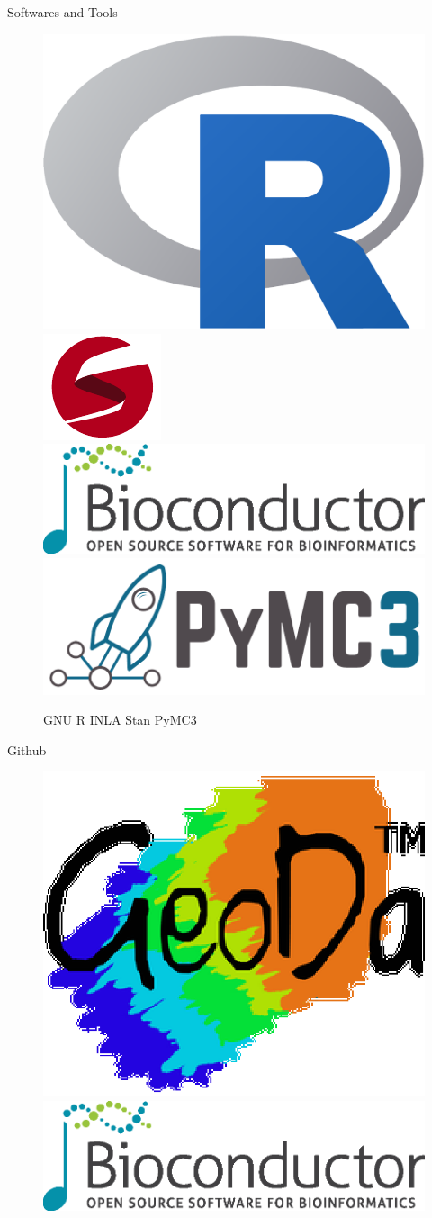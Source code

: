 \documentclass[11pt,compress,xcolor=x11names,UTF8]{beamer}
\begin{document}
\begin{frame}{Softwares and Tools}
\begin{figure}

\centering
\includegraphics[width=.2\textwidth]{software/r}\qquad
\includegraphics[width=.16\textwidth]{software/stan} \\ 
\includegraphics[width=.45\textwidth]{software/bioconductor}
\includegraphics[width=.45\textwidth]{software/PyMC3} 
\caption{{\color{OrangeRed1} GNU R} {\color{SpringGreen4} INLA}  {\color{OrangeRed1} Stan} {\color{SpringGreen4} PyMC3}}

\end{figure}
\end{frame}



\begin{frame}{Github}

\begin{figure}
\centering
\includegraphics[width=.3\textwidth]{software/GeoDa}\\
\includegraphics[width=.8\textwidth]{software/bioconductor}
\end{figure}

\end{frame}
\end{document}
